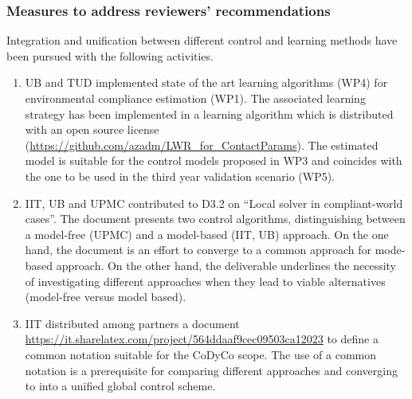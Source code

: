 \documentclass[12pt,a4paper,twoside]{article}
\begin{document}
\subsubsection*{Measures to address reviewers' recommendations}


\medskip
\noindent 
Integration and unification between different control and learning methods have been pursued with the following activities. 

\begin{enumerate}
\item UB and TUD implemented state of the art learning algorithms (WP4) for environmental compliance estimation (WP1). The associated learning strategy has been implemented in a learning algorithm which is distributed with an open source license (\url{https://github.com/azadm/LWR_for_ContactParams}). The estimated model is suitable for the control models proposed in WP3 and coincides with the one to be used in the third year validation scenario (WP5). 

\item IIT, UB and UPMC contributed to D3.2 on ``Local solver in compliant-world cases''. The document presents two control algorithms, distinguishing between a model-free (UPMC) and a model-based (IIT, UB) approach. On the one hand, the document is an effort to converge to a common approach for mode-based approach. On the other hand, the deliverable underlines the necessity of investigating different approaches when they lead to viable alternatives (model-free versus model based). 

\item IIT distributed among partners a document \url{https://it.sharelatex.com/project/564ddaaf9cec09503ca12023} to define a common notation suitable for the CoDyCo scope. The use of a common notation is a prerequisite for comparing different approaches and converging to into a unified global control scheme. 
\end{enumerate}
\end{document}
